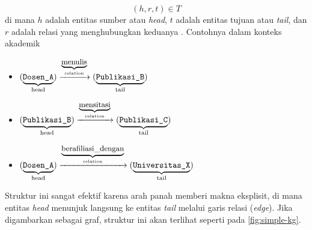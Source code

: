\begin{equation}
    (h, r, t) \in T
    \label{eq:triplet-format}
\end{equation}
di mana $h$ adalah entitas sumber atau \textit{head}, $t$ adalah entitas tujuan atau \textit{tail}, dan $r$ adalah relasi yang menghubungkan keduanya \citep{peng2023knowledge}. Contohnya dalam konteks akademik
\begin{itemize}
    \item $(\underbrace{\text{\texttt{Dosen\_A}}}_{\text{head}}) \xrightarrow{\underbrace{\text{\small menulis}}_{\text{relation}}} (\underbrace{\text{\texttt{Publikasi\_B}}}_{\text{tail}})$
    \item $(\underbrace{\text{\texttt{Publikasi\_B}}}_{\text{head}}) \xrightarrow{\underbrace{\text{\small mensitasi}}_{\text{relation}}} (\underbrace{\text{\texttt{Publikasi\_C}}}_{\text{tail}})$
    \item $(\underbrace{\text{\texttt{Dosen\_A}}}_{\text{head}}) \xrightarrow{\underbrace{\text{\small berafiliasi\_dengan}}_{\text{relation}}} (\underbrace{\text{\texttt{Universitas\_X}}}_{\text{tail}})$
\end{itemize}
Struktur ini sangat efektif karena arah panah memberi makna eksplisit, di mana entitas \textit{head} menunjuk langsung ke entitas \textit{tail} melalui garis relasi (\textit{edge}). Jika digambarkan sebagai graf, struktur ini akan terlihat seperti pada \ref{fig:simple-kg}.

